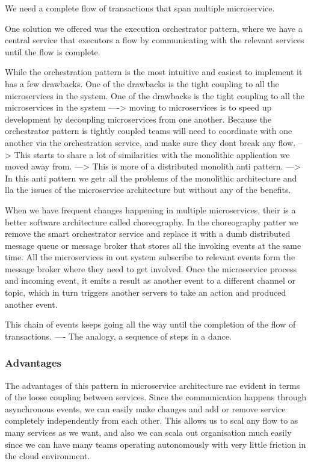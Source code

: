 We need a complete flow of transactions that span multiple microservice.

One solution we offered was the execution orchestrator pattern, where we have a central service that executors a flow by communicating with the relevant services until the flow is complete.

While the orchestration pattern is the most intuitive and easiest to implement it has a few drawbacks.
One of the drawbacks is the tight coupling to all the microservices in the system.
One of the drawbacks is the tight coupling to all the microservices in the system
----> moving to microservices is to speed up development by decoupling microservices from one another.
Because the orchestrator pattern is tightly coupled teams will need to coordinate with one another via the orchestration service, and make sure they dont break any flow.
--> This starts to share a lot of similarities with the monolithic application we moved away from.
---> This is more of a distributed monolith anti pattern.
---> In this anti pattern we getr all the problems of the monolithic architecture and lla the issues of the microservice architecture but without any of the benefits.

When we have frequent changes happening in multiple microservices, their is a better software architecture called choreography.
In the choreography patter we remove the smart orchestrator service and replace it with a dumb distributed message queue or message broker that stores all the invoking events at the same time.
All the microservices in out system subscribe to relevant events form the message broker where they need to get involved.
Once the microservice process and incoming event, it emits a result as another event to a different channel or topic, which in turn triggers another servers to take an action and produced another event.

This chain of events keeps going all the way until the completion of the flow of transactions.
---- The analogy, a sequence of steps in a dance.

\subsubsection{Advantages}
The advantages of this pattern in microservice architecture rae evident in terms of the loose coupling between services.
Since the communication happens through asynchronous events, we can easily make changes and add or remove service completely independently from each other.
This allows us to scal any flow to as many services as we want, and also we can scala out organisation much easily since we can have many teams operating autonomously with very little friction in the cloud environment.

